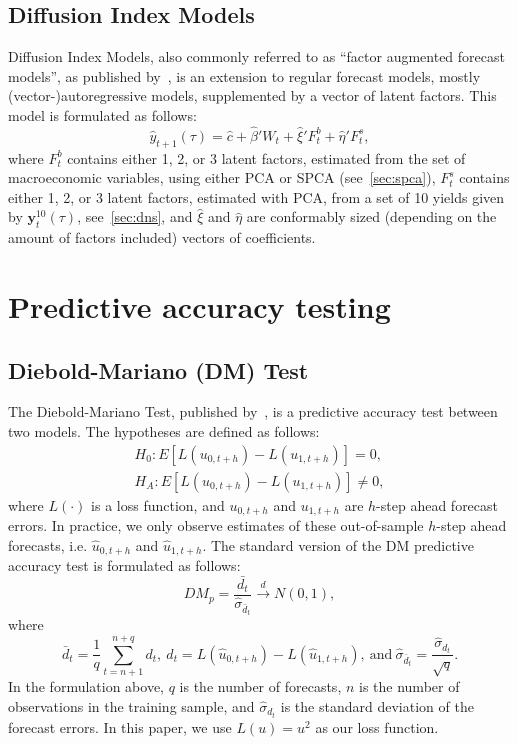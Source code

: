 \subsection{Diffusion Index Models}
\label{sec:dif}
Diffusion Index Models, also commonly referred to as \enquote{factor augmented forecast models}, as published by~\textcite[hereafter DIF]{stock_macroeconomic_2002,stock_forecasting_2002}, is an extension to regular forecast models, mostly (vector-)autoregressive models, supplemented by a vector of latent factors. 
This model is formulated as follows:
\begin{equation}
	\hat{y}_{t+1}(\tau) = \hat{c} + \hat{\beta}' W_t + \hat{\xi}' F_t^b + \hat{\eta}' F_t^s,
\end{equation}
where $F_t^b$ contains either 1, 2, or 3 latent factors, estimated from the set of macroeconomic variables, using either PCA or SPCA (see~\cref{sec:spca}), $F_t^s$ contains either 1, 2, or 3 latent factors, estimated with PCA, from a set of 10 yields given by $\mathbf{y}_t^{10}(\tau)$, see~\cref{sec:dns}, and $\hat{\xi}$ and $\hat{\eta}$ are conformably sized (depending on the amount of factors included) vectors of coefficients. 

\section{Predictive accuracy testing}
\subsection{Diebold-Mariano (DM) Test}
\label{sec:dmtest}
The Diebold-Mariano Test, published by~\textcite[hereafter DM]{diebold_comparing_1994}, is a predictive accuracy test between two models. 
The hypotheses are defined as follows:
\begin{align*}
	H_0 : E\left[L(u_{0,t+h}) - L(u_{1,t+h})\right] = 0, \\
	H_A : E\left[L(u_{0,t+h}) - L(u_{1,t+h})\right] \neq 0,
\end{align*}
where $L(\cdot)$ is a loss function, and $u_{0,t+h}$ and $u_{1,t+h}$ are $h$-step ahead forecast errors. 
In practice, we only observe estimates of these out-of-sample $h$-step ahead forecasts, i.e. $\hat{u}_{0,t+h}$ and $\hat{u}_{1,t+h}$. The standard version of the DM predictive accuracy test is formulated as follows:
\begin{equation}
	DM_p = \frac{\bar{d_t}}{\hat{\sigma}_{\bar{d}_t}} \overset{d}{\rightarrow} N(0,1),
\end{equation}
where
\begin{equation}
	\bar{d}_t = \frac{1}{q} \sum_{t=n+1}^{n+q} d_t,\ d_t = L(\hat{u}_{0,t+h}) - L(\hat{u}_{1,t+h}),\ \text{and}\ \hat{\sigma}_{\bar{d}_t} = \frac{\hat{\sigma}_{d_t}}{\sqrt{q}}.
\end{equation}
In the formulation above, $q$ is the number of forecasts, $n$ is the number of observations in the training sample, and $\hat{\sigma}_{d_t}$ is the standard deviation of the forecast errors. In this paper, we use $L(u) = u^2$ as our loss function.
